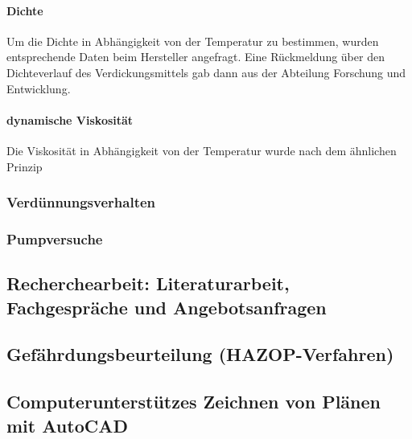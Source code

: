 \paragraph{Dichte} Um die Dichte in Abhängigkeit von der Temperatur zu bestimmen, wurden entsprechende Daten beim Hersteller angefragt. Eine Rückmeldung über den Dichteverlauf des Verdickungsmittels gab dann aus der Abteilung Forschung und Entwicklung. 

\paragraph{dynamische Viskosität} Die Viskosität in Abhängigkeit von der Temperatur  wurde nach dem ähnlichen Prinzip

\subsubsection{Verdünnungsverhalten}
\subsubsection{Pumpversuche}

\subsection{Recherchearbeit: Literaturarbeit, Fachgespräche und Angebotsanfragen}

\subsection{Gefährdungsbeurteilung (HAZOP-Verfahren)}

\subsection{Computerunterstützes Zeichnen von Plänen mit AutoCAD}




